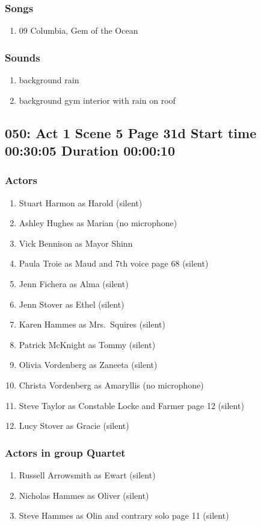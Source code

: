\subsubsection{Songs}
\begin{enumerate}
\item 09 Columbia, Gem of the Ocean
\end{enumerate}\subsubsection{Sounds}
\begin{enumerate}
\item background rain
\item background gym interior with rain on roof
\end{enumerate}
\subsection{050: Act 1 Scene 5 Page 31d Start time 00:30:05 Duration 00:00:10}

\subsubsection{Actors}
\begin{enumerate}
\item Stuart Harmon as Harold (silent)
\item Ashley Hughes as Marian (no microphone)
\item Vick Bennison as Mayor Shinn
\item Paula Troie as Maud and 7th voice page 68 (silent)
\item Jenn Fichera as Alma (silent)
\item Jenn Stover as Ethel (silent)
\item Karen Hammes as Mrs.~Squires (silent)
\item Patrick McKnight as Tommy (silent)
\item Olivia Vordenberg as Zaneeta (silent)
\item Christa Vordenberg as Amaryllis (no microphone)
\item Steve Taylor as Constable Locke and Farmer page 12 (silent)
\item Lucy Stover as Gracie (silent)
\end{enumerate}
\subsubsection{Actors in group Quartet}
\begin{enumerate}
\item Russell Arrowsmith as Ewart (silent)
\item Nicholas Hammes as Oliver (silent)
\item Steve Hammes as Olin and contrary solo page 11 (silent)
\end{enumerate}

